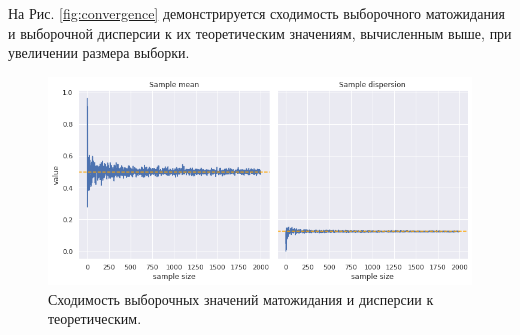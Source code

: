 На Рис. \eqref{fig:convergence} демонстрируется сходимость выборочного матожидания
 и выборочной дисперсии к их теоретическим значениям, вычисленным выше, при увеличении
 размера выборки.

\begin{figure}[ht]
	\centering
	\includegraphics[width = 0.95\linewidth]{"./resources/convergence.png"}
	\caption{Сходимость выборочных значений матожидания и дисперсии к теоретическим.}
     \label{fig:convergence}
\end{figure}
